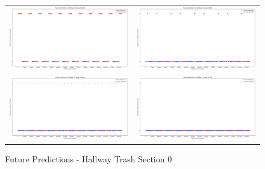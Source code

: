 \begin{figure}
  \begin{tabular}{cc}
    {\includegraphics[width = 3in]{images/results/Future_hallway_T0_Duckett.png}} &
    {\includegraphics[width = 3in]{images/results/Future_hallway_T0_FreMEn.png}} \\
    {\includegraphics[width = 3in]{images/results/Future_hallway_T0_Gaussian.png}} &
    {\includegraphics[width = 3in]{images/results/Future_hallway_T0_HyT-EM.png}} \\
  \end{tabular}
  \caption{Future Predictions - Hallway Trash Section 0}
\end{figure}\\ \\

